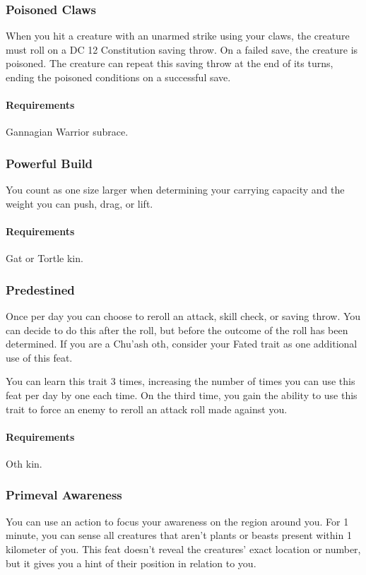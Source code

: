 \subsubsection{Poisoned Claws} \label{feat::poisonedclaws}
    When you hit a creature with an unarmed strike using your claws, the creature must roll on a DC 12 Constitution saving throw.
    On a failed save, the creature is poisoned.
    The creature can repeat this saving throw at the end of its turns, ending the poisoned conditions on a successful save.
    \paragraph{Requirements} Gannagian Warrior subrace.
\subsubsection{Powerful Build} \label{feat::powerfulbuild}
    You count as one size larger when determining your carrying capacity and the weight you can push, drag, or lift.
    \paragraph{Requirements} Gat or Tortle kin.
\subsubsection{Predestined} \label{feat::predenstined}
    Once per day you can choose to reroll an attack, skill check, or saving throw.
    You can decide to do this after the roll, but before the outcome of the roll has been determined.
    If you are a Chu'ash oth, consider your Fated trait as one additional use of this feat.

    You can learn this trait 3 times, increasing the number of times you can use this feat per day by one each time.
    On the third time, you gain the ability to use this trait to force an enemy to reroll an attack roll made against you.
    \paragraph{Requirements} Oth kin.
\subsubsection{Primeval Awareness} \label{feat::primevalawareness}
    You can use an action to focus your awareness on the region around you.
    For 1 minute, you can sense all creatures that aren't plants or beasts present within 1 kilometer of you.
    This feat doesn't reveal the creatures' exact location or number, but it gives you a hint of their position in relation to you.

